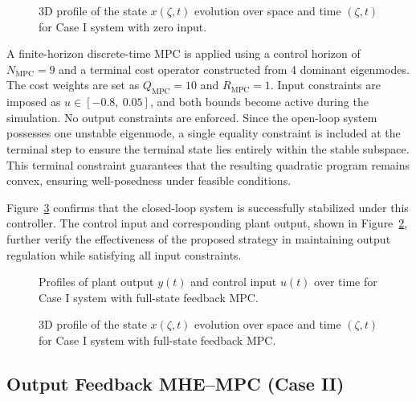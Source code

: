\begin{figure}[!htbp]
    \centering
    
    \caption{3D profile of the state $x(\zeta, t)$ evolution over space and time $(\zeta, t)$ for Case I system with zero input.}
    \label{fig:3_openloop_x}
\end{figure}

A finite-horizon discrete-time MPC is applied using a control horizon of $N_{\mathrm{MPC}} = 9$ and a terminal cost operator constructed from 4 dominant eigenmodes. The cost weights are set as $Q_{\mathrm{MPC}} = 10$ and $R_{\mathrm{MPC}} = 1$. Input constraints are imposed as $u \in [-0.8,\ 0.05]$, and both bounds become active during the simulation. No output constraints are enforced. Since the open-loop system possesses one unstable eigenmode, a single equality constraint is included at the terminal step to ensure the terminal state lies entirely within the stable subspace. This terminal constraint guarantees that the resulting quadratic program remains convex, ensuring well-posedness under feasible conditions.

Figure~\ref{fig:3_MPC_x} confirms that the closed-loop system is successfully stabilized under this controller. The control input and corresponding plant output, shown in Figure~\ref{fig:3_input_output_MPC}, further verify the effectiveness of the proposed strategy in maintaining output regulation while satisfying all input constraints.

\begin{figure}[!htbp]
    \centering
    
    \caption{Profiles of plant output $y(t)$ and control input $u(t)$ over time for Case I system with full-state feedback MPC.}
    \label{fig:3_input_output_MPC}
\end{figure}

\begin{figure}[!htbp]
    \centering
    
    \caption{3D profile of the state $x(\zeta, t)$ evolution over space and time $(\zeta, t)$ for Case I system with full-state feedback MPC.}
    \label{fig:3_MPC_x}
\end{figure}

\subsection{Output Feedback MHE--MPC (Case II)}

